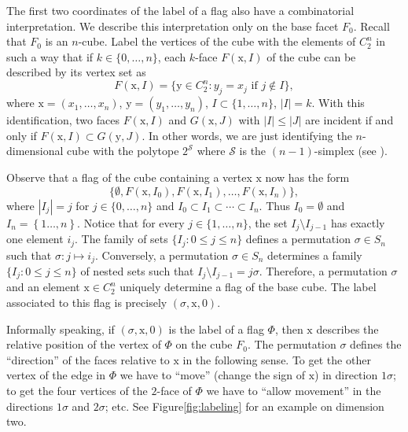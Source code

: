 \documentclass[final]{amsart}
\theoremstyle{plain}
\theoremstyle{definition}
\theoremstyle{remark}
\numberwithin{equation}{section}
\renewcommand{\leq}{\leqslant} \renewcommand{\geq}{\geqslant}
\renewcommand{\{}{\lbrace}
\renewcommand{\}}{\rbrace}
\newcommand{\sm}{\setminus}
\newcommand{\cS}{\mathcal{S}}
\newcommand{\cyvec}[1]{{\mathrm{#1}}}
\newcommand{\vx}{\cyvec{x}}
\newcommand{\vy}{\cyvec{y}}
\newcommand{\cyctwo}[1][n]{ C_{2}^{#1} }
\begin{document}
The first two coordinates of the label of a flag also have a combinatorial interpretation. 
We describe this interpretation only on the base facet $F_{0}$.
Recall that $F_{0}$ is an $n$-cube. 
Label the vertices of the cube with the elements of $\cyctwo$ in such a way that if $k \in \{0, \dots, n\}$, each $k$-face $F(\vx,I)$ of the cube can be described by its vertex set as \[F(\vx, I) =\{\vy  \in \cyctwo : y_{j} = x_{j} \text{ if } j \not\in I\},\] where $\vx = (x_{1}, \dots, x_{n})$, $\vy = (y_{1}, \dots, y_{n})$, $I \subset \{1, \dots, n\}$, $|I|=k$.  With this identification, two faces $F(\vx, I)$ and $G(\vx, J)$ with $|I| \leq |J|$ are incident if and only if $F(\vx,I) \subset G(\vy,J)$. In other words, we are just identifying the $n$-dimensional cube with the polytope $2^{\cS}$ where $\cS$ is the $(n-1)$-simplex (see \cite[Section 5.3]{Matousek_2002_LecturesDiscreteGeometry}).

Observe that  a flag of the cube containing a vertex $\vx$ now has the form  \[\{\emptyset, F(\vx, I_{0}), F(\vx, I_{1}), \dots , F(\vx, I_{n})\},\]  where $|I_{j}|= j$ for $j \in \{0, \dots, n\}$ and $I_{0} \subset I_{1} \subset \cdots \subset I_{n}$. Thus $I_{0}= \emptyset$ and $I_{n}= \left\{ 1 \dots, n \right\}$. Notice that for every $j \in \{1, \dots, n\}$, the set $I_{j} \sm I_{j-1}$ has exactly one element $i_{j}$.
The family of sets $\{I_{j} : 0 \leq j \leq n\}$ defines a permutation $\sigma \in S_{n}$ such that $ \sigma: j \mapsto i_{j}$. Conversely, a permutation $\sigma \in S_{n}$ determines a family $\{I_{j} : 0 \leq j \leq n\}$ of nested sets such that $I_{j} \sm I_{j-1} = j \sigma$.
Therefore, a permutation $\sigma$ and an element $\vx \in \cyctwo$ uniquely determine a flag of the base cube.
The label associated to this flag is precisely $( \sigma,\vx, 0)$.

Informally speaking, if $(\sigma, \vx, 0)$ is the label of a flag $\Phi$, then $\vx$ describes the relative position of the vertex of $\Phi$ on the cube $F_{0}$. The permutation $\sigma$ defines the ``direction'' of the faces relative to $\vx$ in the following sense. To get the other vertex of the edge in $\Phi$ we have to ``move'' (change the sign of $\vx$) in direction $1 \sigma$; to get the four vertices of the $2$-face of $\Phi$ we have to ``allow movement'' in the directions $1 \sigma$ and $2 \sigma$; etc. See Figure\nobreakspace \ref {fig:labeling} for an example on dimension two.
\end{document}
